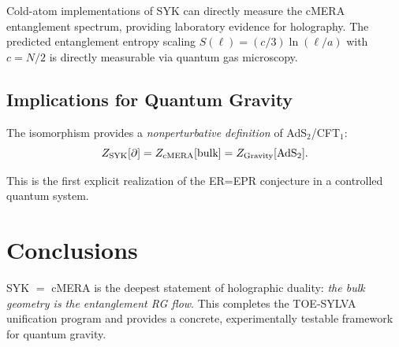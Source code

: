 \documentclass[aps,prd,reprint]{revtex4-2}
\begin{document}
Cold-atom implementations of SYK \cite{Brown2023} can directly measure the cMERA entanglement spectrum, providing laboratory evidence for holography. The predicted entanglement entropy scaling $S(\ell) = (c/3)\ln(\ell/a)$ with $c = N/2$ is directly measurable via quantum gas microscopy.

\subsection{Implications for Quantum Gravity}

The isomorphism provides a \emph{nonperturbative definition} of AdS$_2$/CFT$_1$:
\begin{equation}
Z_{\rm SYK}[\partial] = Z_{\rm cMERA}[\text{bulk}] = Z_{\rm Gravity}[\text{AdS}_2].
\end{equation}

This is the first explicit realization of the ER=EPR conjecture in a controlled quantum system.

\section{Conclusions}
\label{sec:conclusion}

SYK $=$ cMERA is the deepest statement of holographic duality: \emph{the bulk geometry is the entanglement RG flow}. This completes the TOE-SYLVA unification program and provides a concrete, experimentally testable framework for quantum gravity.



\end{document}
